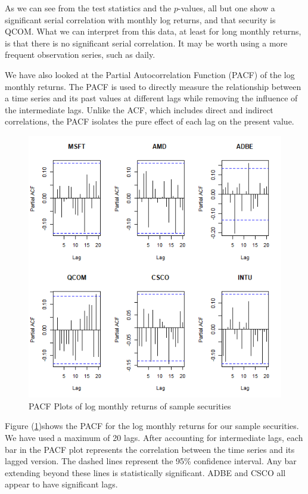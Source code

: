 \documentclass[12pt]{article}
\begin{document}
As we can see from the test statistics and the $p$-values, all but one show a significant serial correlation with monthly log returns, and that security is QCOM. What we can interpret from this data, at least for long monthly returns, is that there is no significant serial correlation. It may be worth using a more frequent observation series, such as daily.

We have also looked at the Partial Autocorrelation Function (PACF) of the log monthly returns. The PACF is used to directly measure the relationship between a time series and its past values at different lags while removing the influence of the intermediate lags. Unlike the ACF, which includes direct and indirect correlations, the PACF isolates the pure effect of each lag on the present value.
\begin{figure}[h]
	\centering
	\includegraphics[height=0.8\linewidth]{plots/pacf_monthly_returns.png}
	\caption{PACF Plots of log monthly returns of sample securities}
	\label{fig:pacf_plot}
\end{figure}
Figure (\ref{fig:pacf_plot})shows the PACF for the log monthly returns for our sample securities. We have used a maximum of 20 lags. After accounting for intermediate lags, each bar in the PACF plot represents the correlation between the time series and its lagged version. The dashed lines represent the 95\% confidence interval. Any bar extending beyond these lines is statistically significant. ADBE and CSCO all appear to have significant lags.
\end{document}
